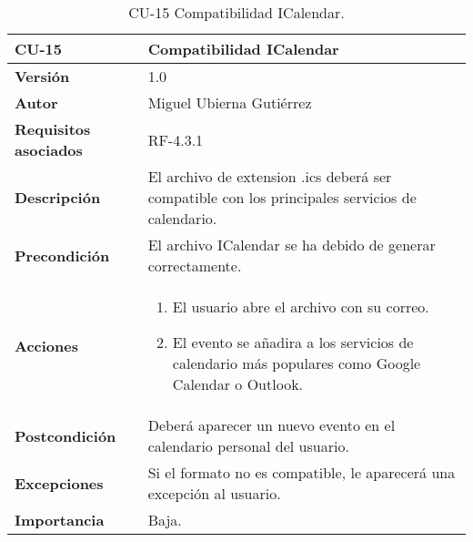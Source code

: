 \begin{table}[p]
	\centering
	\begin{tabularx}{\linewidth}{ p{} p{} }
		\toprule
		\textbf{CU-15}    & \textbf{Compatibilidad ICalendar}\\
		\toprule
		\textbf{Versión}              & 1.0    \\
		\textbf{Autor}                & Miguel Ubierna Gutiérrez \\
		\textbf{Requisitos asociados} & RF-4.3.1  \\
		\textbf{Descripción}          & El archivo de extension .ics deberá ser compatible con los principales servicios de calendario.\\
		\textbf{Precondición}         & El archivo ICalendar se ha debido de generar correctamente.\\
		\textbf{Acciones}             &
		\begin{enumerate}
			\def\labelenumi{\arabic{enumi}.}
			\tightlist
                \item El usuario abre el archivo con su correo.
                \item El evento se añadira a los servicios de calendario más populares como Google Calendar o Outlook.
		\end{enumerate}\\
		\textbf{Postcondición}        & Deberá aparecer un nuevo evento en el calendario personal del usuario. \\
		\textbf{Excepciones}          & Si el formato no es compatible, le aparecerá una excepción al usuario. \\
		\textbf{Importancia}          & Baja.  \\
		\bottomrule
	\end{tabularx}
	\caption{CU-15 Compatibilidad ICalendar.}
\end{table}


